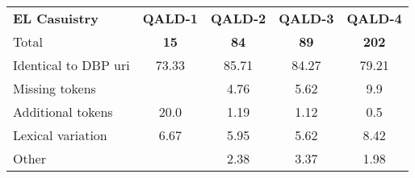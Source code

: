 {\centering
\begin{tabular}{l|c|c|c|c}
\textbf{EL Casuistry}  & \textbf{QALD-1} & \textbf{QALD-2} & \textbf{QALD-3} & \textbf{QALD-4} \\
\hspace{2cm}Total      & \textbf{15}     & \textbf{84}     & \textbf{89}     & \textbf{202} \\ \hline \hline
Identical to DBP uri   & 73.33           & 85.71           & 84.27           & 79.21           \\ \hline
Missing tokens         &                 & 4.76            & 5.62            & 9.9             \\ \hline
Additional tokens      & 20.0            & 1.19            & 1.12            & 0.5             \\ \hline
Lexical variation      & 6.67            & 5.95            & 5.62            & 8.42            \\ \hline
Other                  &                 & 2.38            & 3.37            & 1.98            \\ \hline
\end{tabular}
}
